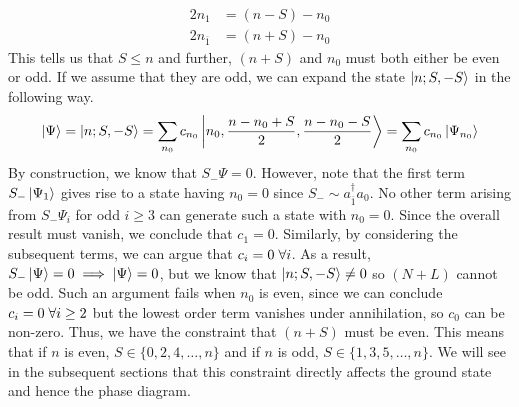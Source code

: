 \begin{align}
    2n_1 &= (n - S) - n_0 \\
    2n_{\overline{1}} &= (n + S) - n_{0}
\end{align}
This tells us that $S \leq n$ and further, $(n+S)$ and $n_0$ must both either be even or odd. If we assume that they are odd, we can expand the state $\ket{n; S, -S}$ in the following way.
\begin{equation}
    \ket{\Psi} = \ket{n; S, -S} = \sum_{n_0} c_{n_0} \ket{n_0, \frac{n -n_0 +S}{2}, \frac{n - n_0 - S}{2}} = \sum_{n_0} c_{n_0} \ket{\Psi_{n_0}}   
\end{equation}
By construction, we know that $S_-\Psi = 0$. However, note that the first term $S_-\ket{\Psi_1}$ gives rise to a state having $n_0 = 0$ since $S_- \sim a_{\overline{1}}^{\dagger}a_0$. No other term arising from $S_-\Psi_i$ for odd $i\geq 3$ can generate such a state with $n_0 = 0$. Since the overall result must vanish, we conclude that $c_{1} = 0$. Similarly, by considering the subsequent terms, we can argue that $c_{i} = 0 \hspace{0.1cm} \forall i$.  As a result, $S_-\ket{\Psi} = 0 \implies \ket{\Psi} = 0$, but we know that $\ket{n;S, -S} \neq 0$ so $(N+L)$ cannot be odd. Such an argument fails when $n_0$ is even, since we can conclude $c_i = 0 \hspace{0.1cm} \forall  i \geq 2$ but the lowest order term vanishes under annihilation, so $c_0$ can be non-zero. Thus, we have the constraint that $(n+S)$ must be even. This means that if $n$ is even, $S \in \{0, 2, 4, \dots, n\}$ and if $n$ is odd, $S \in \{1, 3, 5, \dots, n\}$. We will see in the subsequent sections that this constraint directly affects the ground state and hence the phase diagram. 



